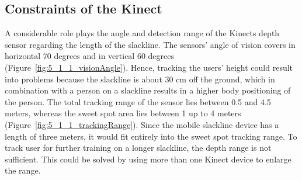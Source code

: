 \subsection{Constraints of the Kinect} 
A considerable role plays the angle and detection range of the Kinects depth sensor regarding the length of the slackline. The sensors’ angle of vision covers in horizontal 70 degrees and in vertical 60 degrees (Figure~\ref{fig:5_1_1_visionAngle}). Hence, tracking the users' height could result into problems because the slackline is about 30 cm off the ground, which in combination with a person on a slackline results in a higher body positioning of the person. The total tracking range of the sensor lies between 0.5 and 4.5 meters, whereas the sweet spot area lies between 1 up to 4 meters~\cite{MicrosoftHIG2014-mh} (Figure~\ref{fig:5_1_1_trackingRange}). Since the mobile slackline device has a length of three meters, it would fit entirely into the sweet spot tracking range. To track user for further training on a longer slackline, the depth range is not sufficient. This could be solved by using more than one Kinect device to enlarge the range. 
